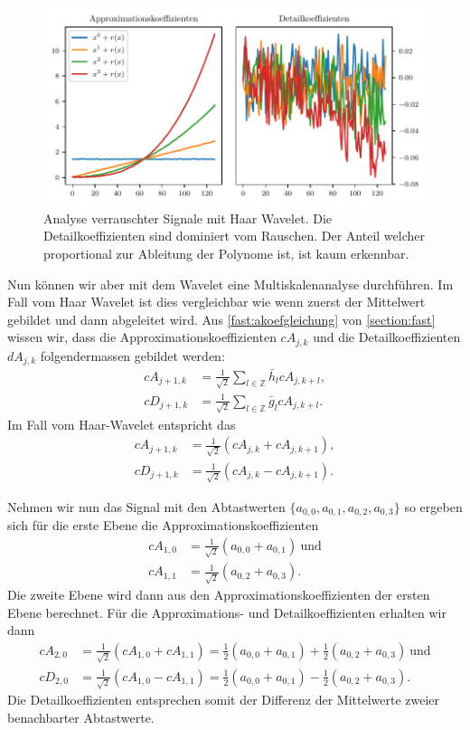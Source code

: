 \begin{refsection}
\begin{figure}
    \centering
    \includegraphics{papers/polynomials/images/polynomials_noise_db1.pdf}
    \caption{Analyse verrauschter Signale mit Haar Wavelet. Die
             Detailkoeffizienten sind dominiert vom Rauschen. Der Anteil
             welcher proportional zur Ableitung der Polynome ist, ist kaum
             erkennbar.\label{polynomials:noise:db1}}
\end{figure}

Nun können wir aber mit dem Wavelet eine Multiskalenanalyse durchführen. Im
Fall vom Haar Wavelet ist dies vergleichbar wie wenn zuerst der Mittelwert
gebildet und dann abgeleitet wird. Aus \cref{fast:akoefgleichung} von
\cref{section:fast} wissen wir, dass die Approximationskoeffizienten $cA_{j,k}$
und die Detailkoeffizienten $dA_{j,k}$ folgendermassen gebildet werden:
\begin{align}
cA_{j+1,k}
&=
\frac{1}{\sqrt{2}} \sum_{l\in\mathbb Z} \bar{h}_l cA_{j,k+l},
\nonumber \\
cD_{j+1,k}
&=
\frac{1}{\sqrt{2}} \sum_{l\in\mathbb Z} \bar{g}_l cA_{j,k+l}.
\end{align}
Im Fall vom Haar-Wavelet entspricht das
\begin{align}
cA_{j+1,k}
&=
\frac{1}{\sqrt{2}} (cA_{j,k} + cA_{j,k+1}),
\nonumber \\
cD_{j+1,k}
&=
\frac{1}{\sqrt{2}} (cA_{j,k} - cA_{j,k+1}).
\end{align}

Nehmen wir nun das Signal mit den Abtastwerten $\{a_{0,0}, a_{0,1}, a_{0,2},
a_{0,3}\}$ so ergeben sich für die erste Ebene die Approximationskoeffizienten
\begin{align}
cA_{1,0}
&=
\frac{1}{\sqrt{2}} (a_{0,0} + a_{0,1})~\text{und}
\nonumber \\
cA_{1,1}
&=
\frac{1}{\sqrt{2}} (a_{0,2} + a_{0,3}).
\end{align}
Die zweite Ebene wird dann aus den Approximationskoeffizienten der ersten Ebene
berechnet. Für die Approximations- und Detailkoeffizienten erhalten wir dann
\begin{align}
cA_{2,0}
&=
\frac{1}{\sqrt{2}} (cA_{1,0} + cA_{1,1})
=
\frac{1}{2} (a_{0,0} + a_{0,1}) + \frac{1}{2} (a_{0,2} + a_{0,3})~\text{und}
\nonumber \\
cD_{2,0}
&=
\frac{1}{\sqrt{2}} (cA_{1,0} - cA_{1,1})
=
\frac{1}{2} (a_{0,0} + a_{0,1}) - \frac{1}{2} (a_{0,2} + a_{0,3}).
\end{align}
Die Detailkoeffizienten entsprechen somit der Differenz der Mittelwerte zweier
benachbarter Abtastwerte.


\end{refsection}
